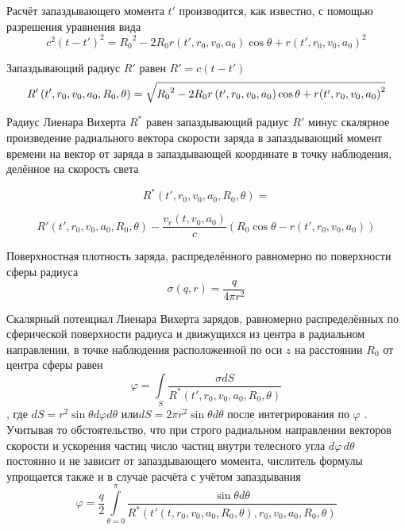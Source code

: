 ﻿\documentclass[12pt, letterpaper]{article}
\begin{document}
Расчёт запаздывающего момента $t'$ производится, как известно, с помощью разрешения уравнения вида
	\[{{c}^{2}}{{\left( t-t' \right)}^{2}}={{R}_{0}}^{2}-2{{R}_{0}}r\left( t',{{r}_{0}},{{v}_{0}},{{a}_{0}} \right)\cos \theta +r{{\left( t',{{r}_{0}},{{v}_{0}},{{a}_{0}} \right)}^{2}}\] 	

Запаздывающий радиус $R'$  равен $R'=c\left( t-t' \right)$
	\[R'\left( t',{{r}_{0}},{{v}_{0}},{{a}_{0}},{{R}_{0}},\theta  \right) = \\
\sqrt{{{R}_{0}}^{2}-2{{R}_{0}}r\left( t',{{r}_{0}},{{v}_{0}},{{a}_{0}} \right)\cos \theta + r{{\left( t',{{r}_{0}},{{v}_{0}},{{a}_{0}} \right)}^{2}}}\] 

Радиус Лиенара Вихерта ${{R}^{*}}$ равен запаздывающий радиус $R'$ минус скалярное произведение радиального вектора скорости заряда в запаздывающий момент времени на вектор от заряда в запаздывающей координате в точку наблюдения, делённое на скорость света

	\[{{R}^{*}}\left( t',{{r}_{0}},{{v}_{0}},{{a}_{0}},{{R}_{0}},\theta  \right) = \]

\[R'\left( t',{{r}_{0}},{{v}_{0}},{{a}_{0}},{{R}_{0}},\theta  \right) - \frac{{{v}_{r}}\left( t,{{v}_{0}},{{a}_{0}} \right)}{c}\left( {{R}_{0}}\cos \theta - r\left( t',{{r}_{0}},{{v}_{0}},{{a}_{0}} \right) \right)\]
	
Поверхностная плотность заряда, распределённого равномерно по поверхности сферы радиуса
	\[\sigma \left( q,r \right)=\frac{q}{4\pi {{r}^{2}}}\] 	

Скалярный потенциал Лиенара Вихерта зарядов, равномерно распределённых по сферической поверхности радиуса  и движущихся из центра в радиальном направлении, в точке наблюдения расположенной по оси $z$  на расстоянии ${{R}_{0}}$ от центра сферы равен \[\varphi =\int\limits_{S}{\frac{\sigma dS}{{{R}^{*}}\left( t',{{r}_{0}},{{v}_{0}},{{a}_{0}},{{R}_{0}},\theta  \right)}}\], где $dS={{r}^{2}}\sin \theta d\varphi d\theta $  или$dS=2\pi {{r}^{2}}\sin \theta d\theta $ после интегрирования по $\varphi $ . Учитывая то обстоятельство, что при строго радиальном направлении векторов скорости и ускорения частиц число частиц внутри телесного угла $d\varphi\, d\theta $ постоянно и не зависит от запаздывающего момента, числитель формулы упрощается также и в случае расчёта с учётом запаздывания
	\[\varphi =\frac{q}{2}\int\limits_{\theta =0}^{\pi }{\frac{\sin \theta d\theta }{{{R}^{*}}\left( t'\left( t,{{r}_{0}},{{v}_{0}},{{a}_{0}},{{R}_{0}},\theta  \right),{{r}_{0}},{{v}_{0}},{{a}_{0}},{{R}_{0}},\theta  \right)}}\] 	
\end{document}
